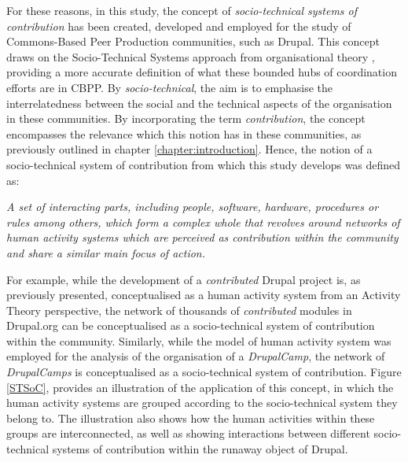 For these reasons, in this study, the concept of \textit{socio-technical systems of contribution} has been created, developed and employed for the study of Commons-Based Peer Production communities, such as Drupal. This concept draws on the Socio-Technical Systems approach from organisational theory \parencite{trist1981evolution}, providing a more accurate definition of what these bounded hubs of coordination efforts are in CBPP. By \textit{socio-technical}, the aim is to emphasise the interrelatedness between the social and the technical aspects of the organisation in these communities. By incorporating the term \textit{contribution}, the concept encompasses the relevance which this notion has in these communities, as previously outlined in chapter \ref{chapter:introduction}. Hence, the notion of a socio-technical system of contribution from which this study develops was defined as:

\textsl{A set of interacting parts, including people, software, hardware, procedures or rules among others, which form a complex whole that revolves around networks of human activity systems which are perceived as contribution within the community and share a similar main focus of action.}

For example, while the development of a \textit{contributed} Drupal project is, as previously presented, conceptualised as a human activity system from an Activity Theory perspective, the network of thousands of \textit{contributed} modules in Drupal.org can be conceptualised as a socio-technical system of contribution within the community. Similarly, while the model of human activity system was employed for the analysis of the organisation of a \textit{DrupalCamp}, the network of \textit{DrupalCamps} is conceptualised as a socio-technical system of contribution.  Figure \ref{STSoC}, provides an illustration of the application of this concept, in which the human activity systems are grouped according to the socio-technical system they belong to. The illustration also shows how the human activities within these groups are interconnected, as well as showing interactions between different socio-technical systems of contribution within the runaway object of Drupal.

